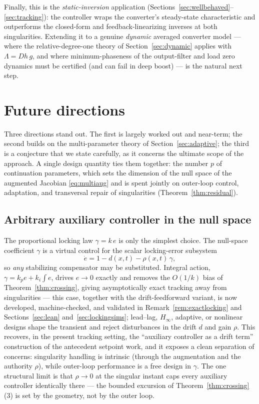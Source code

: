 \documentclass[11pt,american]{article}
\theoremstyle{definition}
\theoremstyle{plain}
\theoremstyle{remark}
\begin{document}
Finally, this is the \emph{static-inversion} application (Sections~\ref{sec:wellbehaved}--\ref{sec:tracking}): the controller wraps the converter's steady-state characteristic and outperforms the closed-form and feedback-linearizing inverses at both singularities. Extending it to a genuine \emph{dynamic} averaged converter model --- where the relative-degree-one theory of Section~\ref{sec:dynamic} applies with $\Lambda = Dh\,g$, and where minimum-phaseness of the output-filter and load zero dynamics must be certified (and can fail in deep boost) --- is the natural next step.

\section{Future directions}\label{sec:future}

Three directions stand out. The first is largely worked out and near-term; the second builds on the multi-parameter theory of Section~\ref{sec:adaptive}; the third is a conjecture that we state carefully, as it concerns the ultimate scope of the approach. A single design quantity ties them together: the number $p$ of continuation parameters, which sets the dimension of the null space of the augmented Jacobian \eqref{eq:multiaug} and is spent jointly on outer-loop control, adaptation, and transversal repair of singularities (Theorem~\ref{thm:residual}).

\subsection{Arbitrary auxiliary controller in the null space}\label{sec:aux}

The proportional locking law $\gamma = k\,e$ is only the simplest choice. The null-space coefficient $\gamma$ is a virtual control for the scalar locking-error subsystem
\begin{equation}
\dot e = 1 - d(x,t) - \rho(x,t)\,\gamma,
\end{equation}
so \emph{any} stabilizing compensator may be substituted. Integral action, $\gamma = k_p e + k_i\!\int e$, drives $e \to 0$ exactly and removes the $O(1/k)$ bias of Theorem~\ref{thm:crossing}, giving asymptotically exact tracking away from singularities --- this case, together with the drift-feedforward variant, is now developed, machine-checked, and validated in Remark~\ref{rem:exactlocking} and Sections~\ref{sec:lean} and~\ref{sec:lockingsims}; lead--lag, $H_\infty$, adaptive, or nonlinear designs shape the transient and reject disturbances in the drift $d$ and gain $\rho$. This recovers, in the present tracking setting, the ``auxiliary controller as a drift term'' construction of the antecedent setpoint work, and it exposes a clean separation of concerns: singularity handling is intrinsic (through the augmentation and the authority $\rho$), while outer-loop performance is a free design in $\gamma$. The one structural limit is that $\rho \to 0$ at the singular instant caps every auxiliary controller identically there --- the bounded excursion of Theorem~\ref{thm:crossing}(3) is set by the geometry, not by the outer loop.
\end{document}
